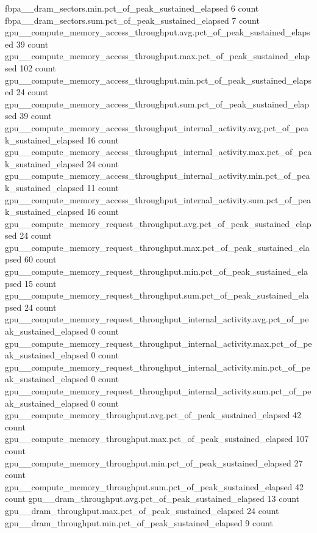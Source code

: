 fbpa__dram_sectors.min.pct_of_peak_sustained_elapsed                                           6 count
fbpa__dram_sectors.sum.pct_of_peak_sustained_elapsed                                           7 count
gpu__compute_memory_access_throughput.avg.pct_of_peak_sustained_elapsed                       39 count
gpu__compute_memory_access_throughput.max.pct_of_peak_sustained_elapsed                      102 count
gpu__compute_memory_access_throughput.min.pct_of_peak_sustained_elapsed                       24 count
gpu__compute_memory_access_throughput.sum.pct_of_peak_sustained_elapsed                       39 count
gpu__compute_memory_access_throughput_internal_activity.avg.pct_of_peak_sustained_elapsed              16 count
gpu__compute_memory_access_throughput_internal_activity.max.pct_of_peak_sustained_elapsed              24 count
gpu__compute_memory_access_throughput_internal_activity.min.pct_of_peak_sustained_elapsed              11 count
gpu__compute_memory_access_throughput_internal_activity.sum.pct_of_peak_sustained_elapsed              16 count
gpu__compute_memory_request_throughput.avg.pct_of_peak_sustained_elapsed                      24 count
gpu__compute_memory_request_throughput.max.pct_of_peak_sustained_elapsed                      60 count
gpu__compute_memory_request_throughput.min.pct_of_peak_sustained_elapsed                      15 count
gpu__compute_memory_request_throughput.sum.pct_of_peak_sustained_elapsed                      24 count
gpu__compute_memory_request_throughput_internal_activity.avg.pct_of_peak_sustained_elapsed               0 count
gpu__compute_memory_request_throughput_internal_activity.max.pct_of_peak_sustained_elapsed               0 count
gpu__compute_memory_request_throughput_internal_activity.min.pct_of_peak_sustained_elapsed               0 count
gpu__compute_memory_request_throughput_internal_activity.sum.pct_of_peak_sustained_elapsed               0 count
gpu__compute_memory_throughput.avg.pct_of_peak_sustained_elapsed                              42 count
gpu__compute_memory_throughput.max.pct_of_peak_sustained_elapsed                             107 count
gpu__compute_memory_throughput.min.pct_of_peak_sustained_elapsed                              27 count
gpu__compute_memory_throughput.sum.pct_of_peak_sustained_elapsed                              42 count
gpu__dram_throughput.avg.pct_of_peak_sustained_elapsed                                        13 count
gpu__dram_throughput.max.pct_of_peak_sustained_elapsed                                        24 count
gpu__dram_throughput.min.pct_of_peak_sustained_elapsed                                         9 count
